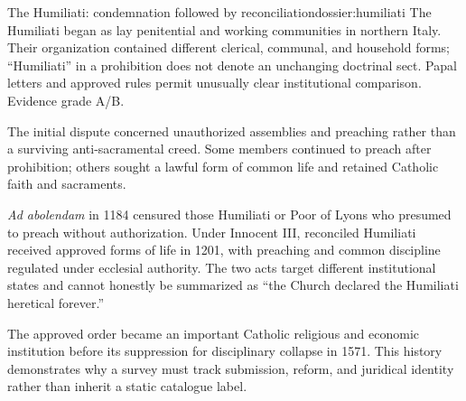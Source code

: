 \begin{heresydossier}{The Humiliati: condemnation followed by reconciliation}{dossier:humiliati}
\objectfield The Humiliati began as lay penitential and working communities in northern Italy. Their organization contained different clerical, communal, and household forms; ``Humiliati'' in a prohibition does not denote an unchanging doctrinal sect. Papal letters and approved rules permit unusually clear institutional comparison. Evidence grade A/B.

\propositionfield The initial dispute concerned unauthorized assemblies and preaching rather than a surviving anti-sacramental creed. Some members continued to preach after prohibition; others sought a lawful form of common life and retained Catholic faith and sacraments.

\responsefield \emph{Ad abolendam} in 1184 censured those Humiliati or Poor of Lyons who presumed to preach without authorization. Under Innocent III, reconciled Humiliati received approved forms of life in 1201, with preaching and common discipline regulated under ecclesial authority. The two acts target different institutional states and cannot honestly be summarized as ``the Church declared the Humiliati heretical forever.''

\aftermathfield The approved order became an important Catholic religious and economic institution before its suppression for disciplinary collapse in 1571. This history demonstrates why a survey must track submission, reform, and juridical identity rather than inherit a static catalogue label.
\end{heresydossier}

